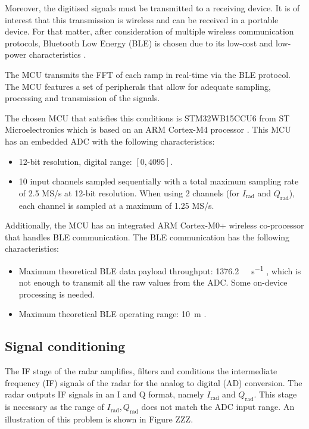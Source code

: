 Moreover, the digitised signals must be transmitted to a receiving device. It is of interest that this transmission is wireless and can be received in a portable device. For that matter, after consideration of multiple wireless communication protocols, Bluetooth Low Energy (BLE) is chosen due to its low-cost and low-power characteristics \cite{Gomez2012}.

The MCU transmits the FFT of each ramp in real-time via the BLE protocol. The MCU features a set of peripherals that allow for adequate sampling, processing and transmission of the signals. 

The chosen MCU that satisfies this conditions is STM32WB15CCU6 from ST Microelectronics which is based on an ARM Cortex-M4 processor \cite{STMicroelectronics2022}. This MCU has an embedded ADC with the following characteristics:
\begin{itemize}
	\item 12-bit resolution, digital range: $[0, 4095]$.
	\item 10 input channels sampled sequentially with a total maximum sampling rate of 2.5 MS/s at 12-bit resolution. When using 2 channels (for $I_\mathrm{rad}$ and $Q_\mathrm{rad}$), each channel is sampled at a maximum of 1.25 MS/s.
\end{itemize}

Additionally, the MCU has an integrated ARM Cortex-M0+ wireless co-processor that handles BLE communication. The BLE communication has the following characteristics:
\begin{itemize}
	\item Maximum theoretical BLE data payload throughput: \SI{1376.2}{\kilo\bit\per\second} \cite{NordicSemiconductor2019,Bluetooth52},  which is not enough to transmit all the raw values from the ADC. Some on-device processing is needed.
	\item Maximum theoretical BLE operating range: \SI{10}{\meter} \cite{Bluetooth52}.
\end{itemize}
\subsection{Signal conditioning}

The IF stage of the radar amplifies, filters and conditions the intermediate frequency (IF) signals of the radar for the analog to digital (AD) conversion. The radar outputs IF signals in an I and Q format, namely $I_\mathrm{rad}$ and $Q_\mathrm{rad}$. This stage is necessary as the range of $I_\mathrm{rad}, Q_\mathrm{rad}$ does not match the ADC input range. An illustration of this problem is shown in Figure ZZZ.

